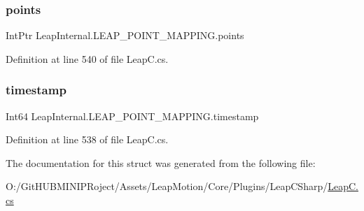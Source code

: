 \subsubsection{\texorpdfstring{points}{points}}
{\footnotesize\ttfamily Int\+Ptr Leap\+Internal.\+L\+E\+A\+P\+\_\+\+P\+O\+I\+N\+T\+\_\+\+M\+A\+P\+P\+I\+N\+G.\+points}



Definition at line 540 of file Leap\+C.\+cs.

\mbox{\label{struct_leap_internal_1_1_l_e_a_p___p_o_i_n_t___m_a_p_p_i_n_g_acb64d96f8427a3ed35a9996af2b53860}} 
\subsubsection{\texorpdfstring{timestamp}{timestamp}}
{\footnotesize\ttfamily Int64 Leap\+Internal.\+L\+E\+A\+P\+\_\+\+P\+O\+I\+N\+T\+\_\+\+M\+A\+P\+P\+I\+N\+G.\+timestamp}



Definition at line 538 of file Leap\+C.\+cs.



The documentation for this struct was generated from the following file\+:\begin{DoxyCompactItemize}
\item 
O\+:/\+Git\+H\+U\+B\+M\+I\+N\+I\+P\+Roject/\+Assets/\+Leap\+Motion/\+Core/\+Plugins/\+Leap\+C\+Sharp/\mbox{\hyperlink{_leap_c_8cs}{Leap\+C.\+cs}}\end{DoxyCompactItemize}
